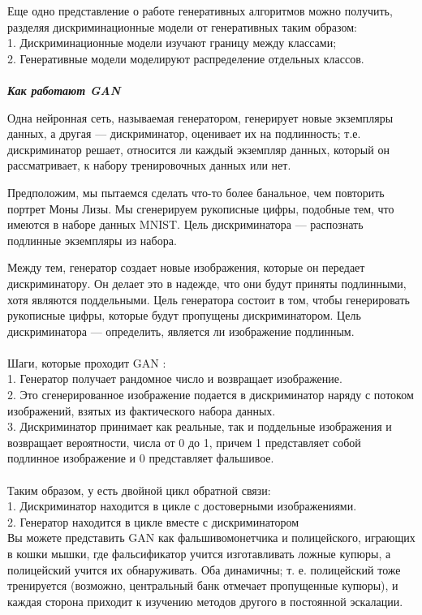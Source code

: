 \documentclass{article}
\begin{document}
Еще одно представление о работе генеративных алгоритмов можно получить, разделяя дискриминационные модели от генеративных таким образом: \\
1. Дискриминационные модели изучают границу между классами; \\
2. Генеративные модели моделируют распределение отдельных классов.\\ \\
\textbf{\textit{Как работают GAN}}

Одна нейронная сеть, называемая генератором, генерирует новые экземпляры данных, а другая — дискриминатор, оценивает их на подлинность; т.е. дискриминатор решает, относится ли каждый экземпляр данных, который он рассматривает, к набору тренировочных данных или нет.

Предположим, мы пытаемся сделать что-то более банальное, чем повторить портрет Моны Лизы. Мы сгенерируем рукописные цифры, подобные тем, что имеются в наборе данных MNIST. Цель дискриминатора — распознать подлинные экземпляры из набора.

Между тем, генератор создает новые изображения, которые он передает дискриминатору. Он делает это в надежде, что они будут приняты подлинными, хотя являются поддельными. Цель генератора состоит в том, чтобы генерировать рукописные цифры, которые будут пропущены дискриминатором. Цель дискриминатора — определить, является ли изображение подлинным. \\ \\
Шаги, которые проходит GAN : \\
1. Генератор получает рандомное число и возвращает изображение. \\
2. Это сгенерированное изображение подается в дискриминатор наряду с потоком изображений, взятых из фактического набора данных.\\
3. Дискриминатор принимает как реальные, так и поддельные изображения и возвращает вероятности, числа от 0 до 1, причем 1 представляет собой подлинное изображение и 0 представляет фальшивое. \\ \\
Таким образом, у есть двойной цикл обратной связи: \\
1. Дискриминатор находится в цикле с достоверными изображениями. \\
2. Генератор находится в цикле вместе с дискриминатором \\

Вы можете представить GAN как фальшивомонетчика и полицейского, играющих в кошки мышки, где фальсификатор учится изготавливать ложные купюры, а полицейский учится их обнаруживать. Оба динамичны; т. е. полицейский тоже тренируется (возможно, центральный банк отмечает пропущенные купюры), и каждая сторона приходит к изучению методов другого в постоянной эскалации.
\end{document}
